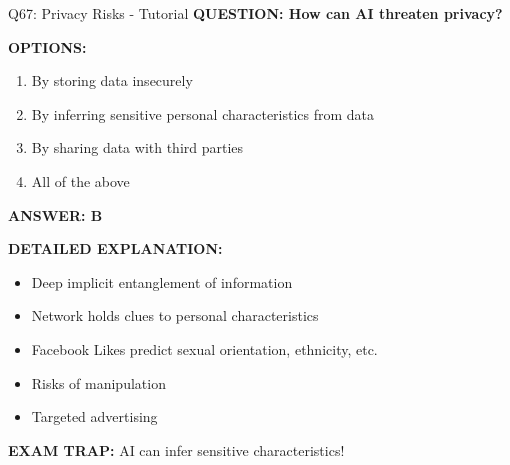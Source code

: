 \documentclass[8pt]{beamer}
\begin{document}
	\begin{frame}{Q67: Privacy Risks - Tutorial}
		\fontsize{6.5}{7.5}\selectfont
		\textbf{QUESTION: How can AI threaten privacy?}
		
		\vspace{0.1cm}
		\textbf{OPTIONS:}
		\begin{enumerate}
			\item By storing data insecurely
			\item By inferring sensitive personal characteristics from data
			\item By sharing data with third parties
			\item All of the above
		\end{enumerate}
		
		\vspace{0.1cm}
		\textcolor{myblue}{\textbf{ANSWER: B}}
		
		\vspace{0.1cm}
		\textbf{DETAILED EXPLANATION:}
		\begin{itemize}
			\item Deep implicit entanglement of information
			\item Network holds clues to personal characteristics
			\item Facebook Likes predict sexual orientation, ethnicity, etc.
			\item Risks of manipulation
			\item Targeted advertising
		\end{itemize}
		
		\vspace{0.1cm}
		\textcolor{myred}{\textbf{EXAM TRAP:}} AI can \textcolor{myblue}{infer sensitive characteristics}!
	\end{frame}
	
\end{document}

